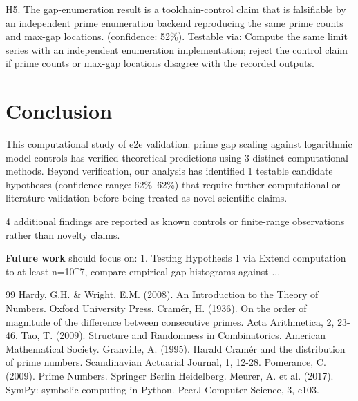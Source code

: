 \documentclass[11pt,a4paper]{article}
\begin{document}
H5. The gap-enumeration result is a toolchain-control claim that is falsifiable by an independent prime enumeration backend reproducing the same prime counts and max-gap locations. (confidence: 52\%). Testable via: Compute the same limit series with an independent enumeration implementation; reject the control claim if prime counts or max-gap locations disagree with the recorded outputs.


\section{Conclusion}
This computational study of e2e validation: prime gap scaling against logarithmic model controls has verified theoretical predictions using 3 distinct computational methods. Beyond verification, our analysis has identified 1 testable candidate hypotheses (confidence range: 62\%–62\%) that require further computational or literature validation before being treated as novel scientific claims.

4 additional findings are reported as known controls or finite-range observations rather than novelty claims.

\textbf{Future work} should focus on:
1. Testing Hypothesis 1 via Extend computation to at least n=10\textasciicircum{}7, compare empirical gap histograms against ...


\begin{thebibliography}{99}
 Hardy, G.H. \& Wright, E.M. (2008). An Introduction to the Theory of Numbers. Oxford University Press.
 Cramér, H. (1936). On the order of magnitude of the difference between consecutive primes. Acta Arithmetica, 2, 23-46.
 Tao, T. (2009). Structure and Randomness in Combinatorics. American Mathematical Society.
 Granville, A. (1995). Harald Cramér and the distribution of prime numbers. Scandinavian Actuarial Journal, 1, 12-28.
 Pomerance, C. (2009). Prime Numbers. Springer Berlin Heidelberg.
 Meurer, A. et al. (2017). SymPy: symbolic computing in Python. PeerJ Computer Science, 3, e103.
\end{thebibliography}
\end{document}
